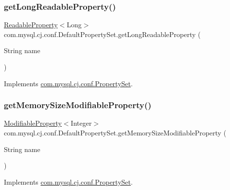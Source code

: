 \subsubsection{\texorpdfstring{get\+Long\+Readable\+Property()}{getLongReadableProperty()}}
{\footnotesize\ttfamily \mbox{\hyperlink{interfacecom_1_1mysql_1_1cj_1_1conf_1_1_readable_property}{Readable\+Property}}$<$Long$>$ com.\+mysql.\+cj.\+conf.\+Default\+Property\+Set.\+get\+Long\+Readable\+Property (\begin{DoxyParamCaption}\item[{String}]{name }\end{DoxyParamCaption})}



Implements \mbox{\hyperlink{interfacecom_1_1mysql_1_1cj_1_1conf_1_1_property_set_a33a32415fb023b197006630115166ad4}{com.\+mysql.\+cj.\+conf.\+Property\+Set}}.

\mbox{\label{classcom_1_1mysql_1_1cj_1_1conf_1_1_default_property_set_a6c2860544a6fc9ea0c1aab92e1db6ae6}} 
\subsubsection{\texorpdfstring{get\+Memory\+Size\+Modifiable\+Property()}{getMemorySizeModifiableProperty()}}
{\footnotesize\ttfamily \mbox{\hyperlink{interfacecom_1_1mysql_1_1cj_1_1conf_1_1_modifiable_property}{Modifiable\+Property}}$<$Integer$>$ com.\+mysql.\+cj.\+conf.\+Default\+Property\+Set.\+get\+Memory\+Size\+Modifiable\+Property (\begin{DoxyParamCaption}\item[{String}]{name }\end{DoxyParamCaption})}



Implements \mbox{\hyperlink{interfacecom_1_1mysql_1_1cj_1_1conf_1_1_property_set_a8cc24f5252be30243814c05679700586}{com.\+mysql.\+cj.\+conf.\+Property\+Set}}.

\mbox{\label{classcom_1_1mysql_1_1cj_1_1conf_1_1_default_property_set_ae7157aefbd409a972ffe014ab383d25b}} 
